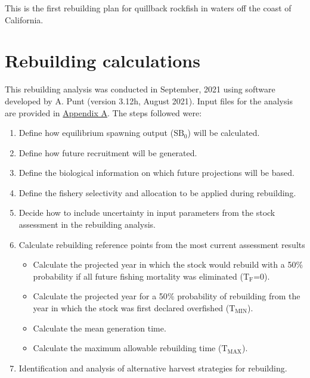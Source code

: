 \documentclass[11pt,
  english,
  a4paper,
]{article}
\begin{document}
\leavevmode\tagmcend\tagstructend


This is the first rebuilding plan for quillback rockfish in waters off the coast of California.

\leavevmode\tagmcend\tagstructend\par


\hypertarget{rebuilding-calculations}{%
\section{Rebuilding calculations}\label{rebuilding-calculations}}

\leavevmode\tagmcend\tagstructend


This rebuilding analysis was conducted in September, 2021 using software developed by A. Punt (version 3.12h, August 2021). Input files for the analysis are provided in {\protect\hyperlink{append_a}{Appendix A}\leavevmode\tagmcend\tagstructend}. The steps followed were:

\leavevmode\tagmcend\tagstructend\par

\begin{enumerate}
    \item Define how equilibrium spawning output ($\text{SB}_0$) will be calculated. 
    \item Define how future recruitment will be generated.
    \item Define the biological information on which future projections will be based.
    \item Define the fishery selectivity and allocation to be applied during rebuilding. 
    \item Decide how to include uncertainty in input parameters from the stock assessment in the rebuilding analysis. 
    \item Calculate rebuilding reference points from the most current assessment results 
    \begin{itemize}
        \item Calculate the projected year in which the stock would rebuild with a 50$\%$ probability if all future fishing mortality was eliminated ($\text{T}_\text{F}$=0).
        \item  Calculate the projected year for a 50$\%$ probability of rebuilding from the year in which the stock was first declared overfished ($\text{T}_\text{MIN}$). 
        \item Calculate the mean generation time. 
        \item Calculate the maximum allowable rebuilding time ($\text{T}_\text{MAX}$). 
    \end{itemize}
    \item Identification and analysis of alternative harvest strategies for rebuilding. 
\end{enumerate}
\end{document}
